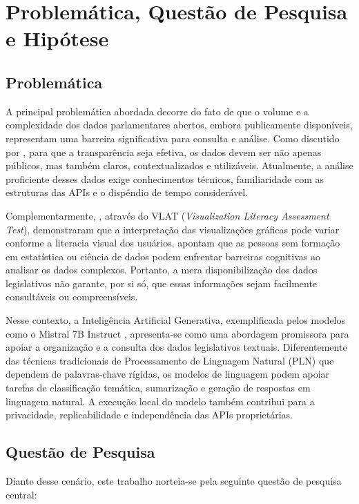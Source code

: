 \section{Problemática, Questão de Pesquisa e Hipótese}

\subsection{Problemática}
A principal problemática abordada decorre do fato de que o volume e a complexidade dos dados parlamentares abertos, embora publicamente disponíveis, representam uma barreira significativa para consulta e análise. Como discutido por , para que a transparência seja efetiva, os dados devem ser não apenas públicos, mas também claros, contextualizados e utilizáveis. Atualmente, a análise proficiente desses dados exige conhecimentos técnicos, familiaridade com as estruturas das APIs e o dispêndio de tempo considerável.

Complementarmente, , através do VLAT (\textit{Visualization Literacy Assessment Test}), demonstraram que a interpretação das visualizações gráficas pode variar conforme a literacia visual dos usuários.  apontam que as pessoas sem formação em estatística ou ciência de dados podem enfrentar barreiras cognitivas ao analisar os dados complexos. Portanto, a mera disponibilização dos dados legislativos não garante, por si só, que essas informações sejam facilmente consultáveis ou compreensíveis.

Nesse contexto, a Inteligência Artificial Generativa, exemplificada pelos modelos como o Mistral 7B Instruct \cite{MistralAI2024}, apresenta-se como uma abordagem promissora para apoiar a organização e a consulta dos dados legislativos textuais. Diferentemente das técnicas tradicionais de Processamento de Linguagem Natural (PLN) que dependem de palavras-chave rígidas, os modelos de linguagem podem apoiar tarefas de classificação temática, sumarização e geração de respostas em linguagem natural. A execução local do modelo também contribui para a privacidade, replicabilidade e independência das APIs proprietárias.

\subsection{Questão de Pesquisa}
Diante desse cenário, este trabalho norteia-se pela seguinte questão de pesquisa central:

